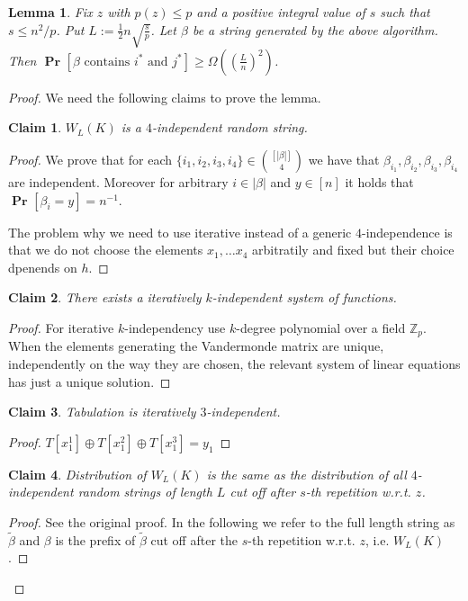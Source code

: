 \documentclass{article}
\newcommand{\probs}[2]{\operatorname{\mathbf{Pr}}_{{#1}}\left[{#2}\right]}
\newcommand{\prob}[1]{\probs{}{#1}}
\newtheorem{lemma}{Lemma}
\newtheorem{claim}{Claim}
\begin{document}
\begin{lemma}
Fix $z$ with $p(z) \leq p$ and a positive integral value of $s$ such that $s \leq n^2/p$.
Put $L := \frac{1}{2}n\sqrt{\frac{s}{p}}$.
Let $\beta$ be a string generated by the above algorithm. 
Then $\prob{\beta\mbox{ contains }i^{*}\mbox{ and }j^{*}} \geq \Omega\left(\left(\frac{L}{n}\right)^2\right)$.
\end{lemma}
\begin{proof}
We need the following claims to prove the lemma.

\begin{claim}
$W_L(K)$ is a $4$-independent random string.
\label{claim-independence}
\end{claim}
\begin{proof}
We prove that for each $\{i_1, i_2, i_3, i_4\} \in \binom{[|\beta|]}{4}$ we have that $\beta_{i_1}, \beta_{i_2}, \beta_{i_3}, \beta_{i_4}$ are independent. Moreover for arbitrary $i \in |\beta|$ and $y \in [n]$ it holds that $\prob{\beta_{i} = y} = n^{-1}$.

The problem why we need to use iterative instead of a generic $4$-independence is that we do not choose the elements $x_1, \dots x_4$ arbitratily and fixed but their choice dpenends on $h$.
\end{proof}

\begin{claim}
There exists a iteratively $k$-independent system of functions.
\end{claim}
\begin{proof}
For iterative $k$-independency use $k$-degree polynomial over a field $\mathbb{Z}_p$.
When the elements generating the Vandermonde matrix are unique, independently on the way they are chosen, the relevant system of linear equations has just a unique solution.
\end{proof}

\begin{claim}
Tabulation is iteratively $3$-independent.
\end{claim}
\begin{proof}
$T[x_1^1] \oplus T[x_1^2] \oplus T[x_1^3] = y_1$
\end{proof}

\begin{claim}
Distribution of $W_L(K)$ is the same as the distribution of all $4$-independent random strings of length $L$ cut off after $s$-th repetition w.r.t. $z$.
\label{claim-cut-off}
\end{claim}
\begin{proof}
See the original proof. In the following we refer to the full length string as $\tilde \beta$ and $\beta$ is the prefix of $\tilde{\beta}$ cut off after the $s$-th repetition w.r.t. $z$, i.e. $W_L(K)$.
\end{proof}


\end{proof}
\end{document}
